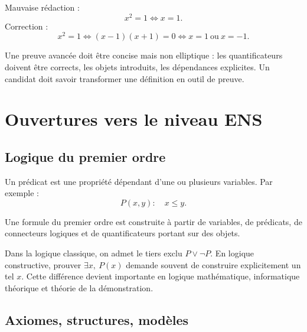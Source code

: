 \documentclass[11pt,a4paper]{article}
\newcommand{\non}{\neg}
\newcommand{\ou}{\vee}
\newcommand{\ssi}{\Longleftrightarrow}
\begin{document}
\begin{exemplebox}
Mauvaise rédaction :
\[
x^2=1\ssi x=1.
\]
Correction :
\[
x^2=1\ssi (x-1)(x+1)=0\ssi x=1\ \text{ou}\ x=-1.
\]
\end{exemplebox}

\begin{ensbox}
Une preuve avancée doit être concise mais non elliptique : les quantificateurs doivent être corrects, les objets introduits, les dépendances explicites. Un candidat doit savoir transformer une définition en outil de preuve.
\end{ensbox}

\section{Ouvertures vers le niveau ENS}

\subsection{Logique du premier ordre}

\begin{definitionbox}[prédicat]
Un prédicat est une propriété dépendant d'une ou plusieurs variables. Par exemple :
\[
P(x,y):\quad x\leq y.
\]
\end{definitionbox}

\begin{definitionbox}
Une formule du premier ordre est construite à partir de variables, de prédicats, de connecteurs logiques et de quantificateurs portant sur des objets.
\end{definitionbox}

\begin{ensbox}
Dans la logique classique, on admet le tiers exclu \(P\ou\non P\). En logique constructive, prouver \(\exists x,\ P(x)\) demande souvent de construire explicitement un tel \(x\). Cette différence devient importante en logique mathématique, informatique théorique et théorie de la démonstration.
\end{ensbox}

\subsection{Axiomes, structures, modèles}
\end{document}
